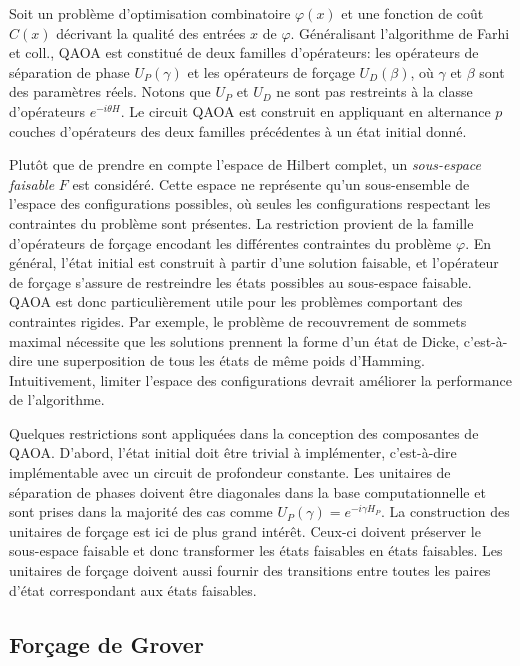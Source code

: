Soit un problème d'optimisation combinatoire $\varphi(x)$ et une fonction de coût $C(x)$ décrivant la qualité des entrées $x$ de $\varphi$. Généralisant l'algorithme de Farhi et coll., QAOA est constitué de deux familles d'opérateurs: les opérateurs de séparation de phase $U_{P}(\gamma)$ et les opérateurs de forçage $U_{D}(\beta)$, où $\gamma$ et $\beta$ sont des paramètres réels. Notons que $U_{P}$ et $U_{D}$ ne sont pas restreints à la classe d'opérateurs $e^{-i \theta H}$. Le circuit QAOA est construit en appliquant en alternance $p$ couches d'opérateurs des deux familles précédentes à un état initial donné.
        
Plutôt que de prendre en compte l'espace de Hilbert complet, un \textit{sous-espace faisable} $F$ est considéré. Cette espace ne représente qu'un sous-ensemble de l'espace des configurations possibles, où seules les configurations respectant les contraintes du problème sont présentes. La restriction provient de la famille d'opérateurs de forçage encodant les différentes contraintes du problème $\varphi$. En général, l'état initial est construit à partir d'une solution faisable, et l'opérateur de forçage s'assure de restreindre les états possibles au sous-espace faisable. QAOA est donc particulièrement utile pour les problèmes comportant des contraintes rigides. Par exemple, le problème de recouvrement de sommets maximal nécessite que les solutions prennent la forme d'un état de Dicke, c'est-à-dire une superposition de tous les états de même poids d'Hamming. Intuitivement, limiter l'espace des configurations devrait améliorer la performance de l'algorithme. 

Quelques restrictions sont appliquées dans la conception des composantes de QAOA. D'abord, l'état initial doit être trivial à implémenter, c'est-à-dire implémentable avec un circuit de profondeur constante. Les unitaires de séparation de phases doivent être diagonales dans la base computationnelle et sont prises dans la majorité des cas comme $U_{P}(\gamma) = e^{-i \gamma H_{P}}$. La construction des unitaires de forçage est ici de plus grand intérêt. Ceux-ci doivent préserver le sous-espace faisable et donc transformer les états faisables en états faisables. Les unitaires de forçage doivent aussi fournir des transitions entre toutes les paires d'état correspondant aux états faisables.


\subsection{Forçage de Grover}
\label{subsec:forcage-de-grover}

